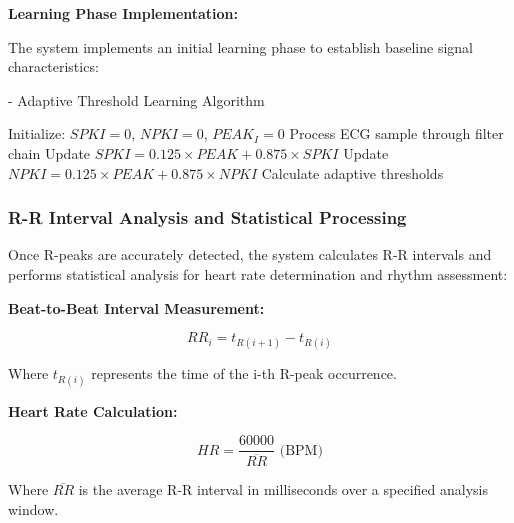 \documentclass[12pt,a4paper]{article}
\begin{document}
\vspace{0.5cm}

\textbf{Learning Phase Implementation:}

The system implements an initial learning phase to establish baseline signal characteristics:

\begin{algorithm}
\caption{- Adaptive Threshold Learning Algorithm}
\begin{algorithmic}
\STATE Initialize: $SPKI = 0$, $NPKI = 0$, $PEAK_I = 0$
    \STATE Process ECG sample through filter chain
        \STATE Update $SPKI = 0.125 \times PEAK + 0.875 \times SPKI$
    \ELSE
        \STATE Update $NPKI = 0.125 \times PEAK + 0.875 \times NPKI$
    \ENDIF
    \STATE Calculate adaptive thresholds
\ENDFOR
\end{algorithmic}
\end{algorithm}

\subsubsection{R-R Interval Analysis and Statistical Processing}

Once R-peaks are accurately detected, the system calculates R-R intervals and performs statistical analysis for heart rate determination and rhythm assessment:

\newpage

\vspace{0.5cm}

\textbf{Beat-to-Beat Interval Measurement:}

\begin{equation*}
RR_i = t_{R(i+1)} - t_{R(i)}
\end{equation*}

Where $t_{R(i)}$ represents the time of the i-th R-peak occurrence.

\vspace{0.3cm}

\textbf{Heart Rate Calculation:}

\begin{equation*}
HR = \frac{60000}{\overline{RR}} \text{ (BPM)}
\end{equation*}

Where $\overline{RR}$ is the average R-R interval in milliseconds over a specified analysis window.

\vspace{0.3cm}
\end{document}
